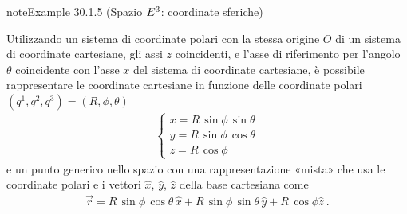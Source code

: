 \documentclass[letterpaper,10pt,italian]{jupyterBook}
\begin{document}
\begin{sphinxadmonition}{note}{Example 30.1.5 (Spazio \protect\(E^3\protect\): coordinate sferiche)}



\sphinxAtStartPar
Utilizzando un sistema di coordinate polari con la stessa origine \(O\) di un sistema di coordinate cartesiane, gli assi \(z\) coincidenti, e l’asse di riferimento per l’angolo \(\theta\) coincidente con l’asse \(x\) del sistema di coordinate cartesiane, è possibile rappresentare le coordinate cartesiane in funzione delle coordinate polari \((q^1, q^2, q^3) = (R, \phi, \theta)\)
\begin{equation*}
\begin{split}\begin{cases}
  x = R \, \sin \phi \, \sin \theta \\
  y = R \, \sin \phi \, \cos \theta \\
  z = R \, \cos \phi
\end{cases}\end{split}
\end{equation*}
\sphinxAtStartPar
e un punto generico nello spazio \sphinxhyphen{} con una rappresentazione «mista» che usa le coordinate polari e i vettori \(\hat{x}\), \(\hat{y}\), \(\hat{z}\) della base cartesiana\sphinxfootnotemark[1] \sphinxhyphen{} come
\begin{equation*}
\begin{split}\vec{r} = R \, \sin \phi \, \cos \theta \, \hat{x} + R \, \sin \phi \, \sin \theta \, \hat{y} + R \, \cos \phi \hat{z} \ .\end{split}
\end{equation*}\end{sphinxadmonition}
\end{document}
